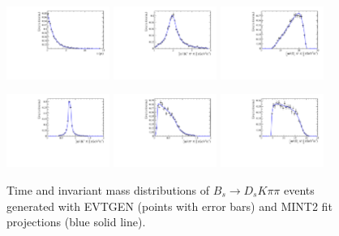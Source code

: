 \begin{figure}[h]
	\centering
		\includegraphics[width=0.3\textwidth, height = !]{figs/fullFit/signal_DsKpipi_CPV_MC/h_t.pdf} 
		\includegraphics[width=0.3\textwidth, height = !]{figs/fullFit/signal_DsKpipi_CPV_MC/s_Kpipi.pdf} 
		\includegraphics[width=0.3\textwidth, height = !]{figs/fullFit/signal_DsKpipi_CPV_MC/s_Dspipi.pdf} 

		\includegraphics[width=0.3\textwidth, height = !]{figs/fullFit/signal_DsKpipi_CPV_MC/s_Kpi.pdf} 
		\includegraphics[width=0.3\textwidth, height = !]{figs/fullFit/signal_DsKpipi_CPV_MC/s_pipi.pdf} 
		\includegraphics[width=0.3\textwidth, height = !]{figs/fullFit/signal_DsKpipi_CPV_MC/s_Dspi.pdf} 
		
		\caption{Time and invariant mass distributions of $B_s \to D_s K \pi\pi$ events generated with \textsf{EVTGEN} (points with error bars) and \textsf{MINT2} fit projections (blue solid line).} 		
\end{figure}	

